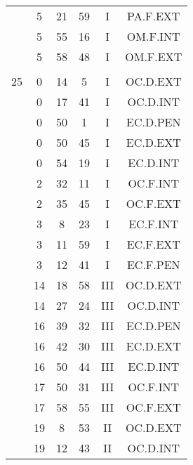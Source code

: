 \documentclass[12pt, a4paper]{article}
\begin{document}
\begin{multicols}{3}
{\begin{tabular}{c c c c c c}
	 	 	 	 & 5 & 21 & 59 & I & PA.F.EXT\\%
	 	 	 	 & 5 & 55 & 16 & I & OM.F.INT\\%
	 	 	 	 & 5 & 58 & 48 & I & OM.F.EXT\\%
	 	 	 	 & & & & & \\%
	 	 	 	25 & 0 & 14 & 5 & I & OC.D.EXT\\%
	 	 	 	 & 0 & 17 & 41 & I & OC.D.INT\\%
	 	 	 	 & 0 & 50 & 1 & I & EC.D.PEN\\%
	 	 	 	 & 0 & 50 & 45 & I & EC.D.EXT\\%
	 	 	 	 & 0 & 54 & 19 & I & EC.D.INT\\%
	 	 	 	 & 2 & 32 & 11 & I & OC.F.INT\\%
	 	 	 	 & 2 & 35 & 45 & I & OC.F.EXT\\%
	 	 	 	 & 3 & 8 & 23 & I & EC.F.INT\\%
	 	 	 	 & 3 & 11 & 59 & I & EC.F.EXT\\%
	 	 	 	 & 3 & 12 & 41 & I & EC.F.PEN\\%
	 	 	 	 & 14 & 18 & 58 & III & OC.D.EXT\\%
	 	 	 	 & 14 & 27 & 24 & III & OC.D.INT\\%
	 	 	 	 & 16 & 39 & 32 & III & EC.D.PEN\\%
	 	 	 	 & 16 & 42 & 30 & III & EC.D.EXT\\%
	 	 	 	 & 16 & 50 & 44 & III & EC.D.INT\\%
	 	 	 	 & 17 & 50 & 31 & III & OC.F.INT\\%
	 	 	 	 & 17 & 58 & 55 & III & OC.F.EXT\\%
	 	 	 	 & 19 & 8 & 53 & II & OC.D.EXT\\%
	 	 	 	 & 19 & 12 & 43 & II & OC.D.INT\\%

\end{tabular}}
\end{multicols}
\end{document}
